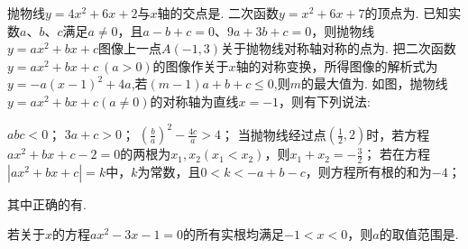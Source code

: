 \documentclass[10pt]{article}
\begin{document}
\begin{questions}{\complitingintroduction}
    \question 抛物线$y = 4x^{2} + 6x + 2$与$x$轴的交点是\complitingline\complitingline.
    \question 二次函数$y = x^{2} + 6x + 7$的顶点为\complitingline.
    \question 已知实数$a$、$b$、$c$满足$a \neq 0$，且$a - b + c = 0$、$9a + 3b + c = 0$，则抛物线$y = ax^{2} + bx + c$图像上一点$A( - 1,3)$关于抛物线对称轴对称的点为\complitingline.
    \question 把二次函数$y = ax^{2} + bx + c\ (a > 0)$的图像作关于$x$轴的对称变换，所得图像的解析式为$y = - a(x - 1)^{2} + 4a$,若$(m - 1)a + b + c \leq 0$,则$m$的最大值为\complitingline.
    \question 如图，抛物线$y = ax^{2} + bx + c (a \neq 0)$的对称轴为直线$x = - 1$，则有下列说法:
    \begin{subsubquestions}
        \subsubquestion $abc < 0$；
        \subsubquestion $3a + c > 0$；
        \subsubquestion $\left( \frac{b}{a} \right)^{2} - \frac{4c}{a} > 4$；
        \subsubquestion 当抛物线经过点$\left( \frac{1}{2},2 \right)$时，若方程$ax^{2} + bx + c - 2 = 0$的两根为$x_{1},x_{2}\left( x_{1} < x_{2} \right)$，则$x_{1} + x_{2} = - \frac{3}{2}$；
        \subsubquestion 若在方程$\left| ax^{2} + bx + c \right| = k$中，$k$为常数，且$0 < k < - a + b - c$，则方程所有根的和为$- 4$；
    \end{subsubquestions}
    其中正确的有\complitingline\complitingline.
    \begin{figure}[htb]
        \centering
        \raggedleft
    \end{figure}
    \question 若关于$x$的方程$ax^2-3x-1=0$的所有实根均满足$-1<x<0$，则$a$的取值范围是\complitingline.
\end{questions}
\end{document}

